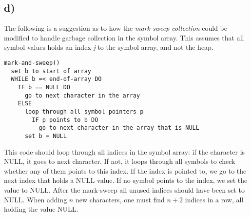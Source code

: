 \subsection*{d)}
The following is a suggestion as to how the \textit{mark-sweep-collection} could be modified to handle garbage collection in the symbol array. This assumes that all symbol values holds an index \textit{j} to the symbol array, and not the heap.

\begin{verbatim}
mark-and-sweep()
  set b to start of array
  WHILE b =< end-of-array DO
    IF b == NULL DO  
      go to next character in the array
    ELSE
      loop through all symbol pointers p
        IF p points to b DO
          go to next character in the array that is NULL
      set b = NULL 
\end{verbatim}

This code should loop through all indices in the symbol array: if the character is NULL, it goes to next character. If not, it loops through all symbols to check whether any of them points to this index. If the index is pointed to, we go to the next index that holds a NULL value. If no symbol points to the index, we set the value to NULL. After the mark-sweep all unused indices should have been set to NULL. When adding $n$ new characters, one must find $n + 2$ indices in a row, all holding the value NULL.
